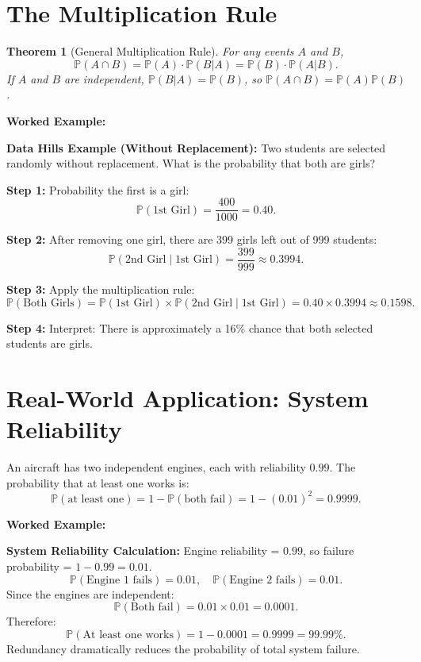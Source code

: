 \documentclass[12pt,a4paper,oneside]{report}
\theoremstyle{mytheorem}
\newtheorem{theorem}{Theorem}[chapter]
\theoremstyle{mydefinition}
\theoremstyle{myremark}
\newenvironment{worked}{%
  \par\medskip\noindent\textbf{\color{myorange}Worked Example:}\par\smallskip
}{%
  \par\medskip
}
\newcommand{\Prob}{\mathbb{P}}
\begin{document}
\section{The Multiplication Rule}
\begin{theorem}[General Multiplication Rule]
For any events $A$ and $B$,
\[
\Prob(A \cap B) = \Prob(A) \cdot \Prob(B|A) = \Prob(B) \cdot \Prob(A|B).
\]
If $A$ and $B$ are independent, $\Prob(B|A) = \Prob(B)$, so $\Prob(A \cap B) = \Prob(A)\Prob(B)$.
\end{theorem}

\begin{worked}
\textbf{Data Hills Example (Without Replacement):}
Two students are selected randomly without replacement. What is the probability that both are girls?

\textbf{Step 1:} Probability the first is a girl:
\[
\Prob(\text{1st Girl}) = \frac{400}{1000} = 0.40.
\]

\textbf{Step 2:} After removing one girl, there are 399 girls left out of 999 students:
\[
\Prob(\text{2nd Girl} \mid \text{1st Girl}) = \frac{399}{999} \approx 0.3994.
\]

\textbf{Step 3:} Apply the multiplication rule:
\[
\Prob(\text{Both Girls}) = \Prob(\text{1st Girl}) \times \Prob(\text{2nd Girl} \mid \text{1st Girl})
= 0.40 \times 0.3994 \approx 0.1598.
\]

\textbf{Step 4:} Interpret: There is approximately a 16\% chance that both selected students are girls.
\end{worked}

\section{Real-World Application: System Reliability}
An aircraft has two independent engines, each with reliability $0.99$. The probability that at least one works is:
\[
\Prob(\text{at least one}) = 1 - \Prob(\text{both fail}) = 1 - (0.01)^2 = 0.9999.
\]

\begin{worked}
\textbf{System Reliability Calculation:}
Engine reliability = $0.99$, so failure probability = $1 - 0.99 = 0.01$.
\[
\Prob(\text{Engine 1 fails}) = 0.01, \quad \Prob(\text{Engine 2 fails}) = 0.01.
\]
Since the engines are independent:
\[
\Prob(\text{Both fail}) = 0.01 \times 0.01 = 0.0001.
\]
Therefore:
\[
\Prob(\text{At least one works}) = 1 - 0.0001 = 0.9999 = 99.99\%.
\]
Redundancy dramatically reduces the probability of total system failure.
\end{worked}
\end{document}
